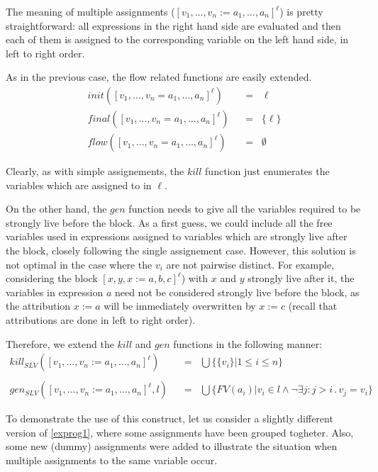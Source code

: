 \documentclass[a4wide,12pt]{article}
\def\eq{\;\; = \;\;}
\def\program#1{\fbox{\begin{minipage}{0.5\textwidth}\protect{$\begin{array}{ll} #1 \end{array}$}\end{minipage}}}
\begin{document}
The meaning of multiple assignments ($[v_1,\ldots,v_n := a_1,\ldots,a_n]^\ell$) is
pretty straightforward: all expressions in the right hand side are evaluated and
then each of them is assigned to the corresponding variable on the left hand side, in left to right order.
 
As in the previous case, the flow related functions are easily extended.
\begin{align*}
init ([v_1,\ldots,v_n = a_1,\ldots,a_n]^\ell) & \eq \ell \\
final([v_1,\ldots,v_n = a_1,\ldots,a_n]^\ell) & \eq \{\ell\} \\
flow ([v_1,\ldots,v_n = a_1,\ldots,a_n]^\ell) & \eq \emptyset
\end{align*}
 
Clearly, as with simple assignements, the $kill$
function just enumerates the variables which are assigned to in $\ell$.
 
On the other hand, the
$gen$ function needs to give all the variables required to be strongly live before the block.
As a first guess, we could include all the
free variables used in expressions assigned to variables which are strongly live after the block, closely following the
single assignement case. However, this solution is not optimal in the case where the $v_i$ are not pairwise distinct.
For example, considering the block $[x,y,x := a,b,c]^\ell$) with $x$ and $y$ strongly live after it, the variables in expression
$a$ need not be considered strongly live before the block, as the attribution $x:=a$ will be immediately overwritten
by $x:=c$ (recall that attributions are done in left to right order).
 
Therefore, we extend the $kill$ and $gen$ functions in the following manner:
\begin{align*}
kill_{SLV}([v_1,\ldots,v_n := a_1,\ldots,a_n]^\ell) & \eq \bigcup\{\{v_i\} | 1 \leq i\leq n\} \\
\\
gen_{SLV}([v_1,\ldots,v_n := a_1,\ldots,a_n]^\ell,l) & \eq \bigcup\{FV(a_i) | v_i \in l \wedge \neg \exists j : j>i \,.\, v_j = v_i\}
\end{align*}
 
To demonstrate the use of this construct, let us consider a slightly different version of
\ref{exprog1}, where some assignments have been grouped togheter. Also, some new (dummy)
assignments were added to illustrate the situation when multiple assignments to the same
variable occur.

\program{}
\end{document}
